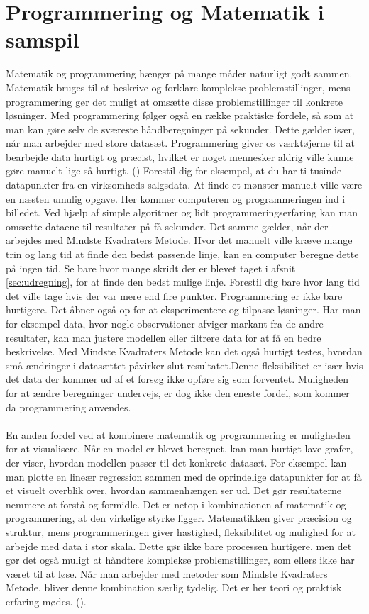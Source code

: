 \section{Programmering og Matematik i samspil}
Matematik og programmering hænger på mange måder naturligt godt sammen. Matematik bruges til at beskrive og forklare komplekse problemstillinger, mens programmering gør det muligt at omsætte disse problemstillinger til konkrete løsninger. Med programmering følger også en række praktiske fordele, så som at
man kan gøre selv de sværeste håndberegninger på sekunder. Dette gælder især, når man arbejder med store datasæt. Programmering giver os værktøjerne til at bearbejde data hurtigt og præcist, hvilket er noget mennesker aldrig ville kunne gøre manuelt lige så hurtigt. (\cite{codeWithC}) Forestil dig for eksempel, at du har ti tusinde datapunkter fra en virksomheds salgsdata. At finde et mønster manuelt ville være en næsten umulig opgave. Her kommer computeren og programmeringen ind i billedet. Ved hjælp af simple algoritmer og lidt programmeringserfaring kan man omsætte dataene til resultater på få sekunder. Det samme gælder, når der arbejdes med Mindste Kvadraters Metode. Hvor det manuelt ville kræve mange trin og lang tid at finde den bedst passende linje, kan en computer beregne dette på ingen tid. Se bare hvor mange skridt der er blevet taget i afsnit \ref{sec:udregning}, for at finde den bedst mulige linje. Forestil dig bare hvor lang tid det ville tage hvis der var mere end fire punkter. Programmering er ikke bare hurtigere. Det åbner også op for at eksperimentere og tilpasse løsninger. Har man for eksempel data, hvor nogle observationer afviger markant fra de andre resultater, kan man justere modellen eller filtrere data for at få en bedre beskrivelse. Med Mindste Kvadraters Metode kan det også hurtigt testes, hvordan små ændringer i datasættet påvirker slut resultatet.Denne fleksibilitet er især hvis det data der kommer ud af et forsøg ikke opføre sig som forventet. Muligheden for at ændre beregninger undervejs, er dog ikke den eneste fordel, som kommer da programmering anvendes. \\\\ En anden fordel ved at kombinere matematik og programmering er muligheden for at visualisere. Når en model er blevet beregnet, kan man hurtigt lave grafer, der viser, hvordan modellen passer til det konkrete datasæt. For eksempel kan man plotte en lineær regression sammen med de oprindelige datapunkter for at få et visuelt overblik over, hvordan sammenhængen ser ud. Det gør resultaterne nemmere at forstå og formidle. Det er netop i kombinationen af matematik og programmering, at den virkelige styrke ligger. Matematikken giver præcision og struktur, mens programmeringen giver hastighed, fleksibilitet og mulighed for at arbejde med data i stor skala. Dette gør ikke bare processen hurtigere, men det gør det også muligt at håndtere komplekse problemstillinger, som ellers ikke har været til at løse. Når man arbejder med metoder som Mindste Kvadraters Metode, bliver denne kombination særlig tydelig. Det er her teori og praktisk erfaring mødes. (\cite{geeksforgeeks}). \\ %

